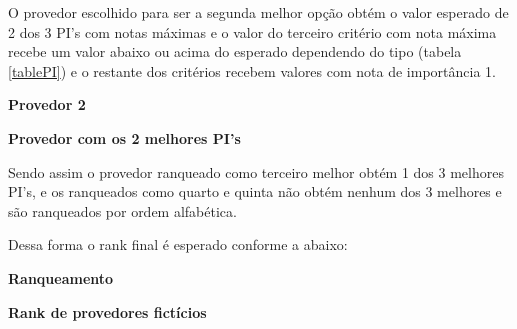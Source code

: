 \documentclass[12pt]{article}[abntex2]
\begin{document}
\newpage
O provedor escolhido para ser a segunda melhor opção obtém o valor esperado de 2 dos 3 PI's com notas máximas e o valor do terceiro critério com nota máxima recebe um valor abaixo ou acima do esperado dependendo do tipo (tabela \ref{tablePI}) e o restante dos critérios recebem valores com nota de importância 1.  

\begin{center}
\textbf{Provedor 2}
\end{center}
\begin{table}[htbp]
\centering
{}
\caption{\textbf{Provedor com os 2 melhores PI's}}
\label{tab:provedor2}
\end{table}

Sendo assim o provedor ranqueado como terceiro melhor obtém 1 dos 3 melhores PI's, e os ranqueados como quarto e quinta não obtém nenhum dos 3 melhores e são ranqueados por ordem alfabética.

Dessa forma o rank final é esperado conforme a abaixo:

\begin{center}
\textbf{Ranqueamento}
\end{center}
\begin{table}[htbp]
\centering
{}
\caption{\textbf{Rank de provedores fictícios}}
\label{rankTest}
\end{table}
\end{document}
